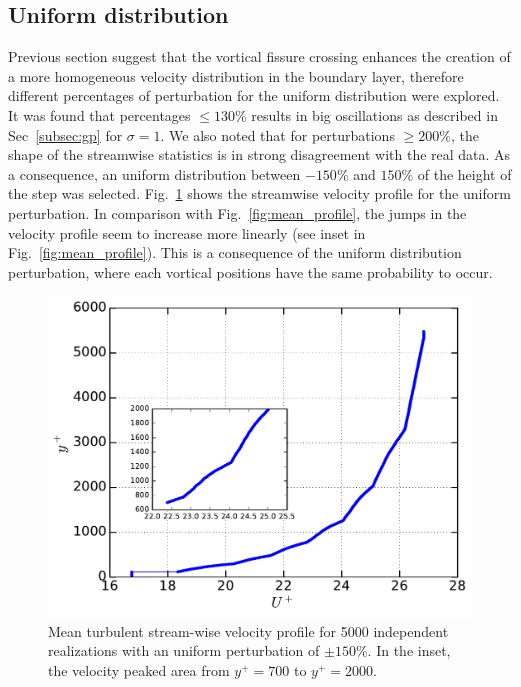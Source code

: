 \documentclass[aps,reprint,amsmath,amssymb,pra]{revtex4-1}%
\begin{document}
\subsection{Uniform distribution}
Previous section suggest that the vortical fissure crossing enhances the creation of a more homogeneous velocity distribution in the boundary layer, therefore different percentages of perturbation for the  uniform distribution were explored. It was found that percentages $\leq 130\%$ results in big oscillations as described in Sec~\ref{subsec:gp} for $\sigma=1$. We also noted that for perturbations $\geq 200\%$, the shape of the streamwise statistics is in strong disagreement with the real data. As a consequence, an uniform distribution between $-150\%$ and $150\%$ of the height of the step was selected. Fig.~\ref{fig:mp_un130} shows the streamwise velocity profile for the uniform perturbation. In comparison with Fig.~\ref{fig:mean_profile}, the jumps in the velocity profile seem to increase more linearly (see inset in Fig.~\ref{fig:mean_profile}). This is a consequence of the uniform distribution perturbation, where each vortical positions have the same probability to occur.  
\begin{figure}[tbh]
\includegraphics[scale=0.45]{figures/Master_averaged_step_profile_5000_assembles_un150}
\caption{\label{fig:mp_un130} Mean turbulent stream-wise velocity profile for 5000 independent realizations with an uniform perturbation of $\pm 150\%$. In the inset, the velocity peaked area from $y^+=700$ to $y^+=2000$.}
\end{figure}
\end{document}
